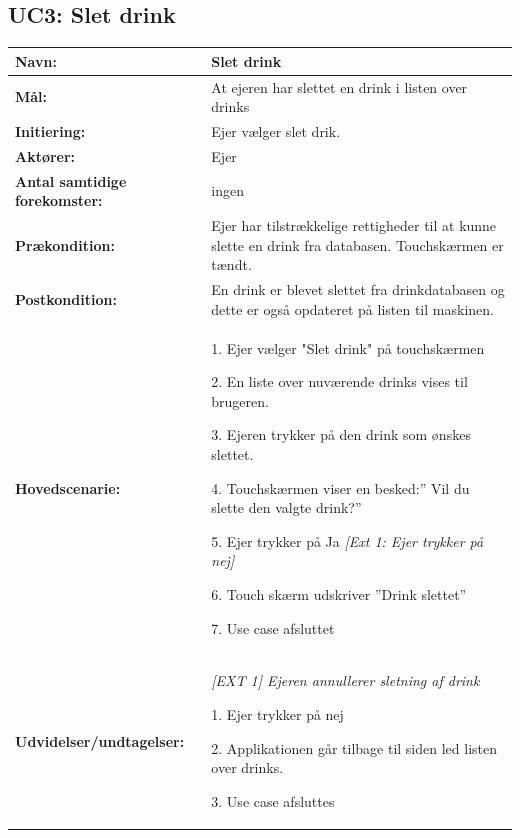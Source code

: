 \subsection{UC3: Slet drink}
\begin{table}[H]
\begin{tabular}{|p{5cm}|p{9cm}|}
\hline
\rowcolor[HTML]{C0C0C0} 
\textbf{Navn:} & Slet drink\\ \hline
\textbf{Mål:} & At ejeren har slettet en drink i listen over drinks\\ \hline
\rowcolor[HTML]{C0C0C0} 
\textbf{Initiering:} & Ejer vælger slet drik.\\ \hline
\textbf{Aktører:} & Ejer\\ \hline
\rowcolor[HTML]{C0C0C0} 
\textbf{Antal samtidige forekomster:} & ingen\\ \hline
\textbf{Prækondition:} & Ejer har tilstrækkelige rettigheder til at kunne slette en drink fra databasen. Touchskærmen er tændt.\\ \hline
\rowcolor[HTML]{C0C0C0} 
\textbf{Postkondition:} & En drink er blevet slettet fra drinkdatabasen og dette er også opdateret på listen til maskinen.\\ \hline
\textbf{Hovedscenarie:} & 
1. Ejer vælger "Slet drink" på touchskærmen
\item 2. En liste over nuværende drinks vises til brugeren.
\item 3. Ejeren trykker på den drink som ønskes slettet. 
\item 4. Touchskærmen viser en besked:” Vil du slette den valgte \hspace*{4mm}drink?”
\item 5. Ejer trykker på Ja \newline
\hspace*{4mm}\textit{[Ext 1: Ejer trykker på nej]}
\item 6. Touch skærm udskriver ”Drink slettet”
\item 7. Use case afsluttet
\\ \hline
\rowcolor[HTML]{C0C0C0} 
\textbf{Udvidelser/undtagelser:} & \textit{[EXT 1] Ejeren annullerer sletning af drink}
\item1. Ejer trykker på nej
\item2. Applikationen går tilbage til siden led listen over drinks.
\item3. Use case afsluttes \\ \hline
\end{tabular}
\end{table}

